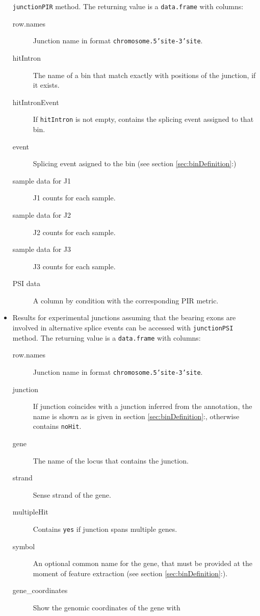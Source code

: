 \documentclass{article}
\newcommand{\secref}[1]{\ref{#1}:\nameref{#1}}
\begin{document}
\begin{itemize}
  \texttt{junctionPIR} method. The returning value is a \texttt{data.frame} with
  columns:
    \begin{description}
      \item[row.names] Junction name in format \texttt{chromosome.5'site-3'site}.
      \item[hitIntron] The name of a bin that match exactly with positions of
      the junction, if it exists.
      \item[hitIntronEvent] If \texttt{hitIntron} is not empty, contains the
      splicing event assigned to that bin.
      \item[event] Splicing event asigned to the bin (see section
      \ref{sec:binDefinition}:)
      \item[sample data for J1] J1 counts for each sample.
      \item[sample data for J2] J2 counts for each sample.
      \item[sample data for J3] J3 counts for each sample.
      \item[PSI data] A column by condition with the corresponding PIR metric.
      \\
    \end{description}
  \item Results for experimental junctions assuming that the bearing
  exons are involved in alternative splice events can be accessed with
  \texttt{junctionPSI} method. The returning value is a \texttt{data.frame} with
  columns:
    \begin{description}
      \item[row.names] Junction name in format \texttt{chromosome.5'site-3'site}.
      \item[junction] If junction coincides with a junction inferred
      from the annotation, the name is shown as is given in section
      \ref{sec:binDefinition}:, otherwise
      contains \texttt{noHit}.
      \item[gene] The name of the locus that contains the junction.
      \item[strand] Sense strand of the gene.
      \item[multipleHit] Contains \texttt{yes} if junction spans multiple
      genes.
      \item[symbol] An optional common name for the gene, that must be provided at
      the moment of feature extraction (see section
      \secref{sec:binDefinition}).
      \item[gene\_coordinates] Show the genomic coordinates of the gene with

\end{description}
\end{itemize}
\end{document}
